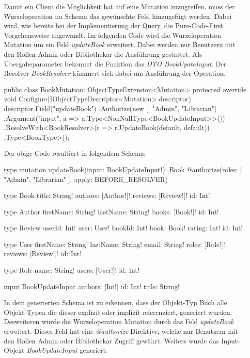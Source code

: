 Damit ein Client die Möglichkeit hat auf eine Mutation zuzugreifen, muss der Wurzeloperation im Schema das gewünschte Feld hinzugefügt werden.
Dabei wird, wie bereits bei der Implementierung der Query, die Pure-Code-First Vorgehensweise angewandt.
\newline
Im folgenden Code wird die Wurzeloperation Mutation um ein Feld \textit{updateBook} erweitert.
Dabei werden nur Benutzern mit den Rollen Admin oder Bibliothekar die Ausführung gestattet.
Als Übergabeparameter bekommt die Funktion das \textit{DTO BookUpateInput}.
Der Resolver \textit{BookResolver} kümmert sich dabei um Ausführung der Operation.

\begin{JsCode}
public class BookMutation: ObjectTypeExtension<Mutation>{
    protected override void Configure(IObjectTypeDescriptor<Mutation> descriptor) {
        descriptor.Field("updateBook")
            .Authorize(new [] {"Admin", "Librarian"})
            .Argument("input", a => a.Type<NonNullType<BookUpdateInput>>())
            .ResolveWith<BookResolver>(r => r.UpdateBook(default, default))
            .Type<BookType>();
    }
}
\end{JsCode}

Der obige Code resultiert in folgendem Schema:
\begin{JsCode}
type mutation{
    updateBook(input: BookUpdateInput!): Book @authorize(roles: [ "Admin", "Librarian" ], apply: BEFORE_RESOLVER)
}

type Book {
  title: String!
  authors: [Author!]!
  reviews: [Review!]!
  id: Int!
}

type Author {
  firstName: String!
  lastName: String!
  books: [Book!]!
  id: Int!
}

type Review {
  userId: Int!
  user: User!
  bookId: Int!
  book: Book!
  rating: Int!
  id: Int!
}

type User {
  firstName: String!
  lastName: String!
  email: String!
  roles: [Role!]!
  reviews: [Review!]!
  id: Int!
}

type Role {
  name: String!
  users: [User!]!
  id: Int!
}

input BookUpdateInput {
  authors: [Int!]
  id: Int!
  title: String!
}
\end{JsCode}

In dem generierten Schema ist zu erkennen, dass der Objekt-Typ Buch alle Objekt-Typen die dieser explizit oder implizit referenziert, generiert wurden.
Desweiteren wurde die Wurzeloperation Mutation durch das Feld \textit{updateBook} erweitert.
Dieses Feld hat eine \textit{@authorize} Direktive, welche nur Benutzern mit den Rollen Admin oder Bibliothekar Zugriff gewährt.
Weiters wurde das Input-Objekt \textit{BookUpdateInput} generiert.
\newline

